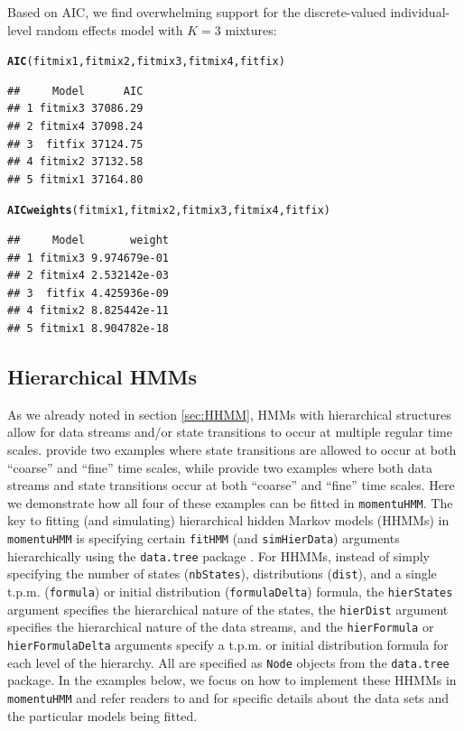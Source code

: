 \documentclass[12pt]{article}\usepackage[]{graphicx}\usepackage[]{xcolor}
\makeatletter
\newcommand{\hldef}[1]{\textcolor[rgb]{0.345,0.345,0.345}{#1}}%
\newcommand{\hlkwd}[1]{\textcolor[rgb]{0.737,0.353,0.396}{\textbf{#1}}}%
\newenvironment{kframe}{%
 \def\at@end@of@kframe{}%
 \ifinner\ifhmode%
  \def\at@end@of@kframe{\end{minipage}}%
  \begin{minipage}{\columnwidth}%
 \fi\fi%
 \def\FrameCommand##1{\hskip\@totalleftmargin \hskip-\fboxsep
 \colorbox{shadecolor}{##1}\hskip-\fboxsep
     \hskip-\linewidth \hskip-\@totalleftmargin \hskip\columnwidth}%
 \MakeFramed {\advance\hsize-\width
   \@totalleftmargin\z@ \linewidth\hsize
   \@setminipage}}%
 {\par\unskip\endMakeFramed%
 \at@end@of@kframe}
\newenvironment{knitrout}{}{} %
\makeatother
\begin{document}
Based on AIC, we find overwhelming support for the discrete-valued individual-level random effects model with $K=3$ mixtures:
\begin{knitrout}
\color{fgcolor}\begin{kframe}
\begin{alltt}
\hlkwd{AIC}\hldef{(fitmix1,fitmix2,fitmix3,fitmix4,fitfix)}
\end{alltt}
\begin{verbatim}
##     Model      AIC
## 1 fitmix3 37086.29
## 2 fitmix4 37098.24
## 3  fitfix 37124.75
## 4 fitmix2 37132.58
## 5 fitmix1 37164.80
\end{verbatim}
\begin{alltt}
\hlkwd{AICweights}\hldef{(fitmix1,fitmix2,fitmix3,fitmix4,fitfix)}
\end{alltt}
\begin{verbatim}
##     Model       weight
## 1 fitmix3 9.974679e-01
## 2 fitmix4 2.532142e-03
## 3  fitfix 4.425936e-09
## 4 fitmix2 8.825442e-11
## 5 fitmix1 8.904782e-18
\end{verbatim}
\end{kframe}
\end{knitrout}



\subsection{Hierarchical HMMs}
\label{sec:HHMMexamples}
As we already noted in section \ref{sec:HHMM}, HMMs with hierarchical structures allow for data streams and/or state transitions to occur at multiple regular time scales. \cite{Leos-BarajasEtAl2017} provide two examples where state transitions are allowed to occur at both ``coarse'' and ``fine'' time scales, while \cite{AdamEtAl2019} provide two examples where both data streams and state transitions occur at both ``coarse'' and ``fine'' time scales. Here we demonstrate how all four of these examples can be fitted in \verb|momentuHMM|. The key to fitting (and simulating) hierarchical hidden Markov models (HHMMs) in \verb|momentuHMM| is specifying certain \verb|fitHMM| (and \verb|simHierData|) arguments hierarchically using the \verb|data.tree| package \citep{Glur2018}. For HHMMs, instead of simply specifying the number of states (\verb|nbStates|), distributions (\verb|dist|), and a single t.p.m. (\verb|formula|) or initial distribution (\verb|formulaDelta|) formula, the \verb|hierStates| argument specifies the hierarchical nature of the states, the \verb|hierDist| argument specifies the hierarchical nature of the data streams, and the \verb|hierFormula| or \verb|hierFormulaDelta| arguments specify a t.p.m. or initial distribution formula for each level of the hierarchy. All are specified as \verb|Node| objects from the \verb|data.tree| package.  In the examples below, we focus on how to implement these HHMMs in \verb|momentuHMM| and refer readers to \cite{Leos-BarajasEtAl2017} and \cite{AdamEtAl2019} for specific details about the data sets and the particular models being fitted.
\end{document}
